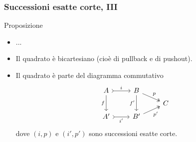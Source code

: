 \documentclass{beamer}
\begin{document}
\begin{frame}[fragile]
  \frametitle{Successioni esatte corte, III}

  \begin{block}{Proposizione}
    \begin{itemize}
    \item ...
    \item Il quadrato è bicartesiano (cioè di pullback e di pushout).
    \item Il quadrato è parte del diagramma commutativo
      \[
        \begin{tikzcd}[row sep=tiny]
          A \ar["{f}", dd, swap] \ar["{i}", rightarrowtail, r] & B
          \ar["{f'}", dd, swap]
          \ar["{p}", twoheadrightarrow, dr] \\
          & & C \\
          A' \ar["{i'}", rightarrowtail, r, swap] & B' \ar["{p'}",
          twoheadrightarrow, ur, swap]
        \end{tikzcd}
      \]
      dove \((i, p)\) e \((i', p')\) sono successioni esatte corte.
    \end{itemize}
  \end{block}
  
\end{frame}
\end{document}
